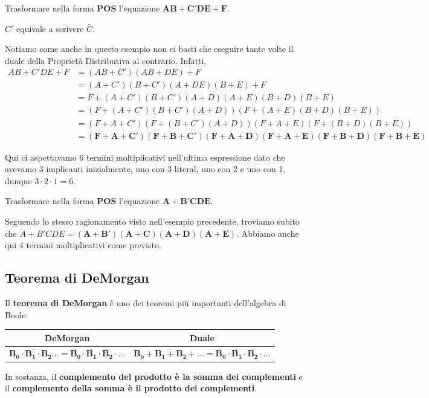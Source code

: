 \documentclass[11pt, a4paper, titlepage, oneside]{scrbook}
\begin{document}
\Esempi \nopagebreak

Trasformare nella forma \textbf{POS} l'equazione $\bm{AB + C'DE + F}$. \nopagebreak

\NB $C'$ equivale a scrivere $\bar{C}$.

Notiamo come anche in questo esempio non ci basti che eseguire tante volte il duale della Proprietà Distributiva al contrario. Infatti, 
\begin{align*}
AB + C'DE + F &= (AB + C')(AB + DE) + F \\
 &= (A + C')(B + C')(A + DE)(B + E) + F \\
 &= F + (A + C')(B + C')(A + D)(A + E)(B + D)(B + E) \\
 &= (F + (A + C')(B + C')(A + D))(F + (A + E)(B + D)(B + E)) \\
 &= (F + A + C')(F + (B + C')(A + D))(F + A + E)(F + (B + D)(B + E)) \\
 &= \bm{(F + A + C')(F + B + C')(F + A + D)(F + A + E)(F + B + D)(F + B + E)}
\end{align*}

\NB Qui ci aspettavamo 6 termini moltiplicativi nell'ultima espressione dato che avevamo 3 implicanti inizialmente, uno con 3 literal, uno con 2 e uno con 1, dunque $3 \cdot 2 \cdot 1 = 6$.

\Separatore

Trasformare nella forma \textbf{POS} l'equazione $\bm{A + B'CDE}$. \nopagebreak

Seguendo lo stesso ragionamento visto nell'esempio precedente, troviamo subito che $A + B'CDE = \bm{(A + B')(A + C)(A + D)(A + E)}$. Abbiamo anche qui 4 termini moltiplicativi come previsto.

\subsection{Teorema di DeMorgan}

\begin{Proprieta}
\label{prop-teorema-DeMorgan}
Il \textbf{teorema di DeMorgan} è uno dei teoremi più importanti dell'algebra di Boole:
\begin{center}
\begin{tabular}{|c|c|}
    \hline
    \textbf{DeMorgan} & \textbf{Duale} \\
    \hline
    $\bm{\overline{B_0 \cdot B_1 \cdot B_2 \ldots} = \overline{B_0} \cdot \overline{B_1} \cdot \overline{B_2} \cdot \ldots}$ & $\bm{\overline{B_0 + B_1 + B_2 + \ldots} = \overline{B_0} \cdot \overline{B_1} \cdot \overline{B_2} \cdot \ldots}$ \\
    \hline
\end{tabular}
\end{center}
In sostanza, il \textbf{complemento del prodotto è la somma dei complementi} e il \textbf{complemento della somma è il prodotto dei complementi}.
\end{Proprieta}
\end{document}
